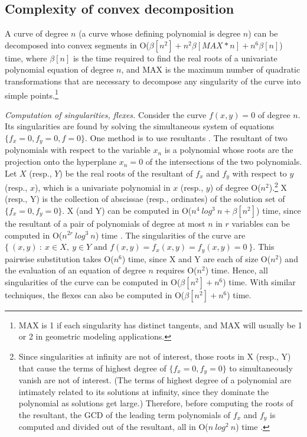 \subsection{Complexity of convex decomposition}

\begin{theorem}
\label{thm-5}
A curve of degree $n$ (a curve whose defining polynomial is degree $n$) 
can be decomposed into convex segments in
O($\beta[n^{2}] + n^{2}\beta[MAX * n] + n^{6}\beta[n]$) time, 
where $\beta[n]$ is the time required to find the 
real roots of a univariate polynomial equation of degree $n$, and MAX is the 
maximum number of quadratic transformations that are necessary to decompose any 
singularity of the curve into simple points.\footnote{MAX is 1 if each 
	singularity has distinct tangents, and MAX will usually be 1 or 2
	in geometric modeling applications. }
\end{theorem}

\clearpage
{}

{\em Computation of singularities, flexes.} 
%
Consider the curve $f(x,y) = 0$ of degree $n$.
Its singularities are found by solving the simultaneous system
of equations \mbox{$\{f_{x} = 0, f_{y}=0, f = 0\}$}.
One method is to use resultants \cite{walker}.
The resultant of two polynomials with respect to the variable $x_{n}$ is a polynomial
whose roots are the projection onto the hyperplane $x_{n} = 0$
of the intersections of the two polynomials.
Let $X$ (resp., $Y$) be the real roots of the resultant of $f_{x}$ and $f_{y}$ 
with respect to $y$ (resp., $x$), which is a univariate polynomial in $x$ (resp., $y$)
of degree O($n^{2}$).\footnote{Since 
	singularities at infinity are not of interest, those roots in X (resp., Y)
	that cause the terms of highest degree of \mbox{$\{f_{x} = 0, f_{y}=0\}$} to 
	simultaneously vanish are not of interest.
	(The terms of highest degree of a polynomial are intimately related to its 
	solutions at infinity, since they dominate the polynomial as solutions get large.)
	Therefore, before computing the roots of the resultant, the GCD of the leading term
	polynomials of $f_{x}$ and $f_{y}$ is computed and divided out of the 
	resultant, all in O($n\ log^{2}\ n$) time \cite{ahu}.}
X (resp., Y) is the collection of abscissae (resp., ordinates)
of the solution set of \mbox{$\{f_{x} = 0, f_{y}=0\}$}.
X (and Y) can be computed in O($n^{4}\ log^{3}\ n + \beta[n^{2}]$) time, since
the resultant of a pair of polynomials of degree at most $n$ in $r$ variables 
can be computed in O($n^{2r}\ log^{3}\ n$) time \cite{bajj}.
The singularities of the curve are
\mbox{$\{\ (x,y)\ :\ x\in X,\ y \in Y \mbox{ and } f(x,y) = f_{x}(x,y) = f_{y}(x,y) = 
0\ \}$.}
This pairwise substitution takes O($n^{6}$) 
time, since X and Y are each of size O($n^{2}$) and the evaluation of an equation of 
degree $n$ requires O($n^{2}$) time.
Hence, all singularities of the curve can be computed in O($\beta[n^{2}] + n^{6}$)
time.
With similar techniques, the flexes can also be computed in O($\beta[n^{2}] + n^{6}$)
time.

